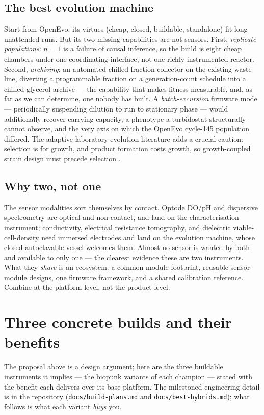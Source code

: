 \documentclass[11pt,a4paper]{article}
\newcommand{\code}[1]{\texttt{\small #1}}
\begin{document}
\subsection{The best evolution machine}
Start from OpenEvo; its virtues (cheap, closed, buildable, standalone) fit long unattended
runs. But its two missing capabilities are not sensors. First, \emph{replicate populations}:
$n=1$ is a failure of causal inference, so the build is eight cheap chambers under one
coordinating interface, not one richly instrumented reactor. Second, \emph{archiving}: an
automated chilled fraction collector on the existing waste line, diverting a programmable
fraction on a generation-count schedule into a chilled glycerol archive --- the capability
that makes fitness measurable, and, as far as we can determine, one nobody has built. A
\emph{batch-excursion} firmware mode --- periodically suspending dilution to run to stationary
phase --- would additionally recover carrying capacity, a phenotype a turbidostat structurally
cannot observe, and the very axis on which the OpenEvo cycle-145 population differed. The
adaptive-laboratory-evolution literature adds a crucial caution: selection is for growth, and
product formation costs growth, so growth-coupled strain design must precede selection
\cite{sandberg2019ale}.

\subsection{Why two, not one}
The sensor modalities sort themselves by contact. Optode DO/pH and dispersive spectrometry are
optical and non-contact, and land on the characterisation instrument; conductivity, electrical
resistance tomography, and dielectric viable-cell-density need immersed electrodes and land on
the evolution machine, whose closed autoclavable vessel welcomes them. Almost no sensor is
wanted by both and available to only one --- the clearest evidence these are two instruments.
What they \emph{share} is an ecosystem: a common module footprint, reusable sensor-module
designs, one firmware framework, and a shared calibration reference. Combine at the platform
level, not the product level.

\section{Three concrete builds and their benefits}
\label{sec:builds}

The proposal above is a design argument; here are the three buildable instruments it implies ---
the biopunk variants of each champion --- stated with the benefit each delivers over its base
platform. The milestoned engineering detail is in the repository
(\code{docs/build-plans.md} and \code{docs/best-hybrids.md}); what follows is what each variant
\emph{buys} you.
\end{document}
